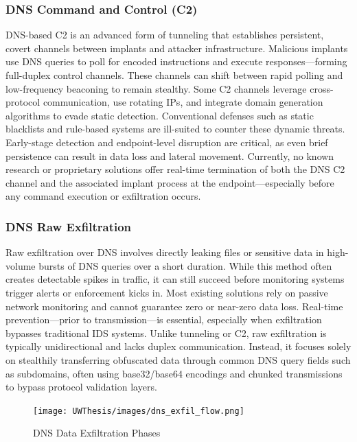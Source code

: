 \documentclass [11pt, proquest] {uwthesis}[2020/02/24]
\begin{document}
\subsubsection{DNS Command and Control (C2)}
DNS-based C2 is an advanced form of tunneling that establishes persistent, covert channels between implants and attacker infrastructure. Malicious implants use DNS queries to poll for encoded instructions and execute responses—forming full-duplex control channels. These channels can shift between rapid polling and low-frequency beaconing to remain stealthy. Some C2 channels leverage cross-protocol communication, use rotating IPs, and integrate domain generation algorithms to evade static detection.
Conventional defenses such as static blacklists and rule-based systems are ill-suited to counter these dynamic threats. Early-stage detection and endpoint-level disruption are critical, as even brief persistence can result in data loss and lateral movement. Currently, no known research or proprietary solutions offer real-time termination of both the DNS C2 channel and the associated implant process at the endpoint—especially before any command execution or exfiltration occurs.

\subsubsection{DNS Raw Exfiltration}
Raw exfiltration over DNS involves directly leaking files or sensitive data in high-volume bursts of DNS queries over a short duration. While this method often creates detectable spikes in traffic, it can still succeed before monitoring systems trigger alerts or enforcement kicks in. Most existing solutions rely on passive network monitoring and cannot guarantee zero or near-zero data loss.
Real-time prevention—prior to transmission—is essential, especially when exfiltration bypasses traditional IDS systems. Unlike tunneling or C2, raw exfiltration is typically unidirectional and lacks duplex communication. Instead, it focuses solely on stealthily transferring obfuscated data through common DNS query fields such as subdomains, often using base32/base64 encodings and chunked transmissions to bypass protocol validation layers.


\label{sec:dns c2 flow}
\begin{figure}[h]
\texttt{[image: UWThesis/images/dns\_exfil\_flow.png]}
\caption{DNS Data Exfiltration Phases}
\end{figure}
\end{document}
